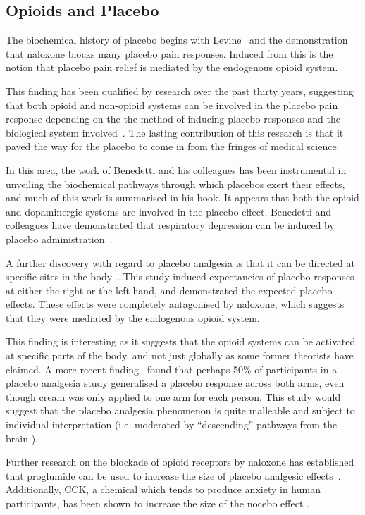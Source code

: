 \subsection{Opioids and Placebo}
\label{sec:opiods-placebo}

The biochemical history of placebo begins with Levine~\cite{Levine1978a} and the demonstration that naloxone blocks many placebo pain responses. Induced from this is the notion that placebo pain relief is mediated by the endogenous opioid system. 

This finding has been qualified by research over the past thirty years, suggesting that both opioid and non-opioid systems can be involved in the placebo pain response depending on the the method of inducing placebo responses and the biological system involved~\cite{Amanzio2001,benedetti2003a}. The lasting contribution of this research is that it paved the way for the placebo to come in from the fringes of medical science.

In this area, the work of Benedetti and his colleagues has been instrumental in unveiling the biochemical pathways through which placebos exert their effects, and much of this work is summarised in his book.  It appears that both the opioid and dopaminergic systems are involved in the placebo effect.  Benedetti and colleagues have demonstrated that respiratory depression can be induced by placebo administration~\cite{Benedetti1999a}. 

A further discovery with regard to placebo analgesia is that it can be directed at specific sites in the body~\cite{Benedetti1999}. This study induced expectancies of placebo responses at either the right or the left hand, and demonstrated the expected placebo effects. These effects were completely antagonised by naloxone, which suggests that they were mediated by the endogenous opioid system. 

This finding is interesting as it suggests that the opioid systems can be activated at specific parts of the body, and not just globally as some former theorists have claimed. A more recent finding~\cite{Watson2006} found that perhaps 50\% of participants in a placebo analgesia study generalised a placebo response across both arms, even though cream was only applied to one arm for each person. 
This study would suggest that the placebo analgesia phenomenon is quite malleable and subject to individual interpretation (i.e. moderated by ``descending'' pathways from the brain \cite{Goffaux2007}). 

Further research on the blockade of opioid receptors by naloxone has established that proglumide can be used to increase the size of placebo analgesic effects~\cite{Benedetti1995}. Additionally, CCK, a chemical which tends to produce anxiety in human participants, has been shown to increase the size of the nocebo effect \cite{Benedetti1996}. 


